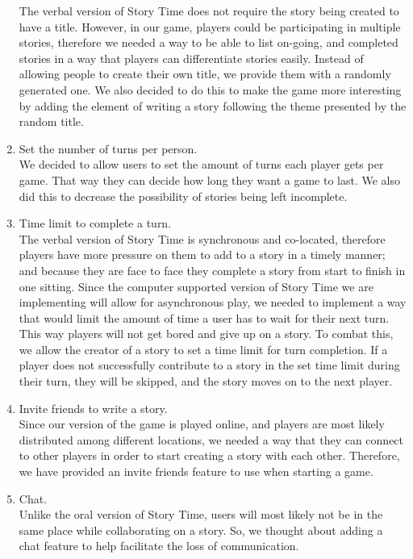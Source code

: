 \documentclass{sigchi}
\begin{document}
\begin{enumerate}[leftmargin=.15in,noitemsep]
The verbal version of Story Time does not require the story being created to have a title. However, in our game, players could be participating in multiple stories, therefore we needed a way to be able to list on-going, and completed stories in a way that players can differentiate stories easily. Instead of allowing people to create their own title, we provide them with a randomly generated one. We also decided to do this to make the game more interesting by adding the element of writing a story following the theme presented by the random title.\\

\item Set the number of turns per person.\\

We decided to allow users to set the amount of turns each player gets per game. That way they can decide how long they want a game to last. We also did this to decrease the possibility of stories being left incomplete. \\

\item Time limit to complete a turn.\\

The verbal version of Story Time is synchronous and co-located, therefore players have more pressure on them to add to a story in a timely manner; and because they are face to face they complete a story from start to finish in one sitting. Since the computer supported version of Story Time we are implementing will allow for asynchronous play, we needed to implement a way that would limit the amount of time a user has to wait for their next turn. This way players will not get bored and give up on a story. To combat this, we allow the creator of a story to set a time limit for turn completion. If a player does not successfully contribute to a story in the set time limit during their turn, they will be skipped, and the story moves on to the next player.\\

\item Invite friends to write a story.\\

Since our version of the game is played online, and players are most likely distributed among different locations, we needed a way that they can connect to other players in order to start creating a story with each other. Therefore, we have provided an invite friends feature to use when starting a game.\\ 

\item Chat.\\

Unlike the oral version of Story Time, users will most likely not be in the same place while collaborating on a story. So, we thought about adding a chat feature to help facilitate the loss of communication.

\end{enumerate}
\end{document}
